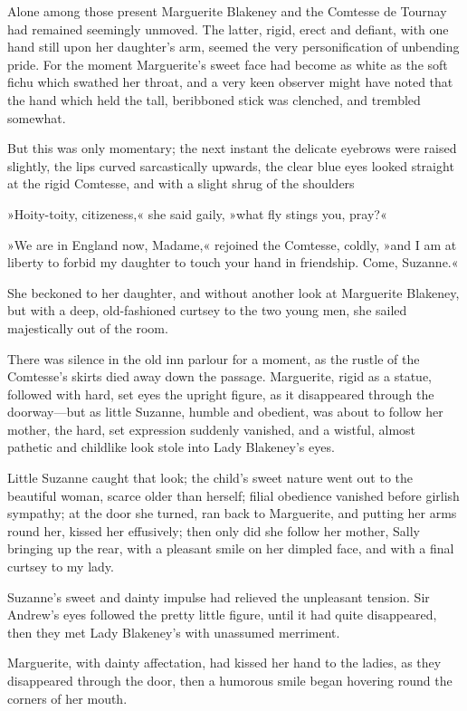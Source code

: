 Alone among those present Marguerite Blakeney and the Comt\-esse de Tournay had remained seemingly unmoved. The latter, rigid, erect and defiant, with one hand still upon her daughter's arm, seemed the very personification of unbending pride. For the moment Marguerite's sweet face had become as white as the soft fichu which swathed her throat, and a very keen observer might have noted that the hand which held the tall, beribboned stick was clenched, and trembled somewhat.

But this was only momentary; the next instant the delicate eyebrows were raised slightly, the lips curved sarcastically upwards, the clear blue eyes looked straight at the rigid Comtesse, and with a slight shrug of the shoulders\longdash


»Hoity-toity, citizeness,« she said gaily, »what fly stings you, pray?«

»We are in England now, Madame,« rejoined the Comtesse, coldly, »and I am at liberty to forbid my daughter to touch your hand in friendship. Come, Suzanne.«

She beckoned to her daughter, and without another look at Marguerite Blakeney, but with a deep, old-fashioned curtsey to the two young men, she sailed majestically out of the room.

There was silence in the old inn parlour for a moment, as the rustle of the Comtesse's skirts died away down the passage. Marguerite, rigid as a statue, followed with hard, set eyes the upright figure, as it disappeared through the doorway—but as little Suzanne, humble and obedient, was about to follow her mother, the hard, set expression suddenly vanished, and a wistful, almost pathetic and childlike look stole into Lady Blakeney's eyes.

Little Suzanne caught that look; the child's sweet nature went out to the beautiful woman, scarce older than herself; filial obedience vanished before girlish sympathy; at the door she turned, ran back to Marguerite, and putting her arms round her, kissed her effusively; then only did she follow her mother, Sally bringing up the rear, with a pleasant smile on her dimpled face, and with a final curtsey to my lady.

Suzanne's sweet and dainty impulse had relieved the unpleasant tension. Sir Andrew's eyes followed the pretty little figure, until it had quite disappeared, then they met Lady Blakeney's with unassumed merriment.

Marguerite, with dainty affectation, had kissed her hand to the ladies, as they disappeared through the door, then a humorous smile began hovering round the corners of her mouth.

